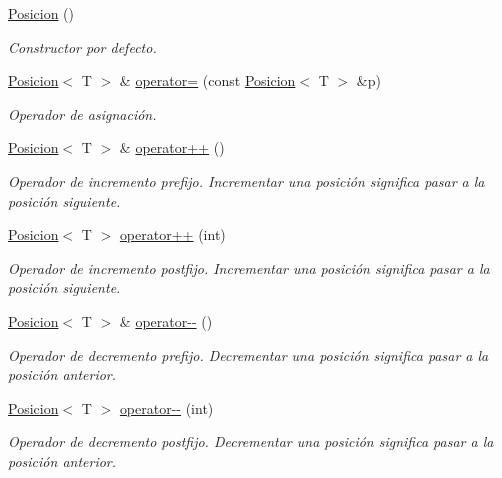 \begin{DoxyCompactItemize}
\item 
\mbox{\label{classPosicion_afc28cb4988f9eaf59eb5601e238ff026}} 
\mbox{\hyperlink{classPosicion_afc28cb4988f9eaf59eb5601e238ff026}{Posicion}} ()
\begin{DoxyCompactList}\small\item\em Constructor por defecto. \end{DoxyCompactList}\item 
\mbox{\hyperlink{classPosicion}{Posicion}}$<$ T $>$ \& \mbox{\hyperlink{classPosicion_a0c65060f8b49a04c46b78f7256289294}{operator=}} (const \mbox{\hyperlink{classPosicion}{Posicion}}$<$ T $>$ \&p)
\begin{DoxyCompactList}\small\item\em Operador de asignación. \end{DoxyCompactList}\item 
\mbox{\hyperlink{classPosicion}{Posicion}}$<$ T $>$ \& \mbox{\hyperlink{classPosicion_adcd8a716e798d29d8c2832d0c6ee020b}{operator++}} ()
\begin{DoxyCompactList}\small\item\em Operador de incremento prefijo. Incrementar una posición significa pasar a la posición siguiente. \end{DoxyCompactList}\item 
\mbox{\hyperlink{classPosicion}{Posicion}}$<$ T $>$ \mbox{\hyperlink{classPosicion_a7b4e96a420c4839fe47252fc3dab4999}{operator++}} (int)
\begin{DoxyCompactList}\small\item\em Operador de incremento postfijo. Incrementar una posición significa pasar a la posición siguiente. \end{DoxyCompactList}\item 
\mbox{\hyperlink{classPosicion}{Posicion}}$<$ T $>$ \& \mbox{\hyperlink{classPosicion_a0844ed364ac81dd1a00cb4454e727a45}{operator-\/-\/}} ()
\begin{DoxyCompactList}\small\item\em Operador de decremento prefijo. Decrementar una posición significa pasar a la posición anterior. \end{DoxyCompactList}\item 
\mbox{\hyperlink{classPosicion}{Posicion}}$<$ T $>$ \mbox{\hyperlink{classPosicion_a31bc501aa4cfb1dd0fdf47a711aada09}{operator-\/-\/}} (int)
\begin{DoxyCompactList}\small\item\em Operador de decremento postfijo. Decrementar una posición significa pasar a la posición anterior. \end{DoxyCompactList}\item 

\end{DoxyCompactItemize}
